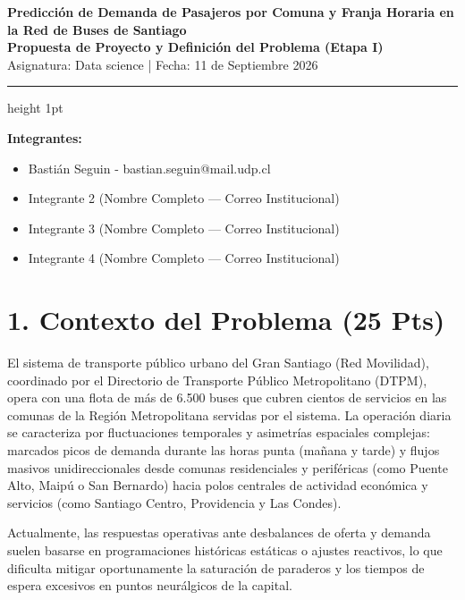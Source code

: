 \documentclass[11pt,letterpaper]{article}
\begin{document}
\begin{center}
    {\fontsize{16}{20}\selectfont \textbf{\color{primary}Predicción de Demanda de Pasajeros por Comuna y Franja Horaria en la Red de Buses de Santiago}}\\[0.6em]
    {\large \textbf{Propuesta de Proyecto y Definición del Problema (Etapa I)}}\\[0.4em]
    {\small \color{darkgray} Asignatura: Data science \quad | \quad Fecha: 11 de Septiembre 2026}
\end{center}

\vspace{0.2em}
\hrule height 1pt
\vspace{0.8em}

\noindent \textbf{Integrantes:}
\begin{itemize}[leftmargin=1.5em]
    \item Bastián Seguin - bastian.seguin@mail.udp.cl
    \item Integrante 2 (Nombre Completo — Correo Institucional)
    \item Integrante 3 (Nombre Completo — Correo Institucional)
    \item Integrante 4 (Nombre Completo — Correo Institucional)
\end{itemize}

\vspace{0.5em}

\section*{\color{primary}1. Contexto del Problema (25 Pts)}
El sistema de transporte público urbano del Gran Santiago (Red Movilidad), coordinado por el Directorio de Transporte Público Metropolitano (DTPM), opera con una flota de más de 6.500 buses que cubren cientos de servicios en las comunas de la Región Metropolitana servidas por el sistema. La operación diaria se caracteriza por fluctuaciones temporales y asimetrías espaciales complejas: marcados picos de demanda durante las horas punta (mañana y tarde) y flujos masivos unidireccionales desde comunas residenciales y periféricas (como Puente Alto, Maipú o San Bernardo) hacia polos centrales de actividad económica y servicios (como Santiago Centro, Providencia y Las Condes).

Actualmente, las respuestas operativas ante desbalances de oferta y demanda suelen basarse en programaciones históricas estáticas o ajustes reactivos, lo que dificulta mitigar oportunamente la saturación de paraderos y los tiempos de espera excesivos en puntos neurálgicos de la capital.
\end{document}
